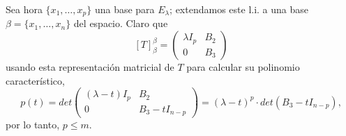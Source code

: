Sea hora $\{x_{1}, \ldots , x_{p}\}$ una base para $E_{\lambda}$;
extendamos este l.i. a una base $\beta = \{ x_{1}, \ldots , x_{n}\}$ del espacio.
Claro que 
\[
[T]_{\beta}^{\beta} = \begin{pmatrix}
	\lambda I_{p} & B_{2} \\
	0 & B_{3}
\end{pmatrix}
\]
usando esta representación matricial de $T$ para calcular su polinomio
característico,
\[
p(t) = det 
\begin{pmatrix}
	(\lambda - t) I_{p} & B_{2} \\
	0 & B_{3} - t I_{n-p}
\end{pmatrix}
= (\lambda - t)^{p} \cdot det( B_{3} - t I_{n-p}),
\]
por lo tanto, $p \leq m$.


\QEDB
\vspace{0.2cm}


